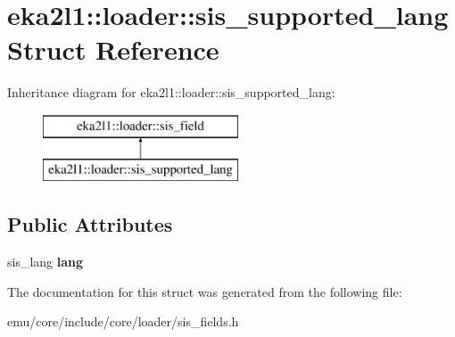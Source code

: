 \hypertarget{structeka2l1_1_1loader_1_1sis__supported__lang}{}\section{eka2l1\+:\+:loader\+:\+:sis\+\_\+supported\+\_\+lang Struct Reference}
\label{structeka2l1_1_1loader_1_1sis__supported__lang}
Inheritance diagram for eka2l1\+:\+:loader\+:\+:sis\+\_\+supported\+\_\+lang\+:\begin{figure}[H]
\begin{center}
\leavevmode
\includegraphics[height=2.000000cm]{structeka2l1_1_1loader_1_1sis__supported__lang}
\end{center}
\end{figure}
\subsection*{Public Attributes}
\begin{DoxyCompactItemize}
\item 
\mbox{\label{structeka2l1_1_1loader_1_1sis__supported__lang_a1401e0af6b6e5bdd318456d0ed808fb7}} 
sis\+\_\+lang {\bfseries lang}
\end{DoxyCompactItemize}


The documentation for this struct was generated from the following file\+:\begin{DoxyCompactItemize}
\item 
emu/core/include/core/loader/sis\+\_\+fields.\+h\end{DoxyCompactItemize}
